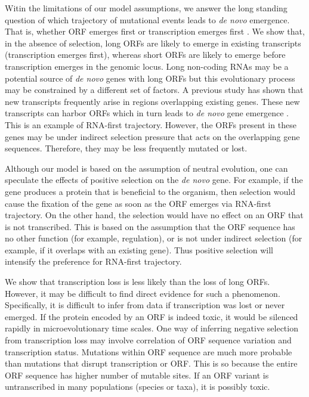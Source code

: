 \documentclass[12pt,a4paper]{article}
\begin{document}
Witin the limitations of our model assumptions, we answer the long standing question of which trajectory of mutational events leads to \textit{de novo} emergence. That is, whether ORF emerges first or transcription emerges first \citep{EBB-F1000}. We show that, in the absence of selection, long ORFs are likely to emerge in existing transcripts (transcription emerges first), whereas short ORFs are likely to emerge before transcription emerges in the genomic locus. Long non-coding RNAs may be a potential source of \textit{de novo} genes with long ORFs but this evolutionary process may be constrained by a different set of factors. A previous study has shown that new transcripts frequently arise in regions overlapping existing genes. These new transcripts can harbor ORFs which in turn leads to \textit{de novo} gene emergence \citep{albaYeastdenovo}. This is an example of RNA-first trajectory. However, the ORFs present in these genes may be under indirect selection pressure that acts on the overlapping gene sequences. Therefore, they may be less frequently mutated or lost.

Although our model is based on the assumption of neutral evolution, one can speculate the effects of positive selection on the \textit{de novo} gene. For example, if the gene produces a protein that is beneficial to the organism, then selection would cause the fixation of the gene as soon as the ORF emerges via RNA-first trajectory. On the other hand, the selection would have no effect on an ORF that is not transcribed. This is based on the assumption that the ORF sequence has no other function (for example, regulation), or is not under indirect selection (for example, if it overlaps with an existing gene). Thus positive selection will intensify the preference for RNA-first trajectory.

We show that transcription loss is less likely than the loss of long ORFs. However, it may be difficult to find direct evidence for such a phenomenon. Specifically, it is difficult to infer from data if transcription was lost or never emerged. If the protein encoded by an ORF is indeed toxic, it would be silenced rapidly in microevolutionary time scales. One way of inferring negative selection from transcription loss may involve correlation of ORF sequence variation and transcription status. Mutations within ORF sequence are much more probable than mutations that disrupt transcription or ORF. This is so because the entire ORF sequence has higher number of mutable sites. If an ORF variant is untranscribed in many populations (species or taxa), it is possibly toxic.  
\end{document}
